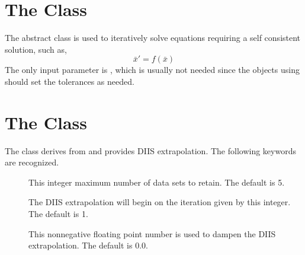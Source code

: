 \section{The  Class}
\label{SelfConsistentExtrapolation}

The  abstract class is used
to iteratively solve equations requiring a self consistent solution,
such as,
\[ \bar{x}' = f(\bar{x}) \]
The only input parameter is , which is usually not needed
since the objects using  should set the
tolerances as needed.

\section{The  Class}
\label{DIIS}

The  class derives from 
and provides DIIS extrapolation.  The following keywords are recognized.

\begin{description}
  \item[] This integer maximum number of data sets to retain.
     The default is 5.

  \item[] The DIIS extrapolation will begin on the iteration
     given by this integer.  The default is 1.

  \item[] This nonnegative floating point number is
     used to dampen the DIIS extrapolation.  The default is 0.0.

\end{description}
